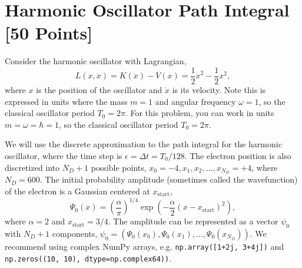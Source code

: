\newpage
\section{Harmonic Oscillator Path Integral [50 Points]}

Consider the harmonic oscillator with Lagrangian,
\begin{equation}
  L(x, \dot{x}) = K(\dot{x}) - V(x) = \frac{1}{2}\dot{x}^2 - \frac{1}{2}x^2,
\end{equation}
where $x$ is the position of the oscillator and $\dot{x}$ is its velocity.
Note this is expressed in units where the mass $m=1$ and angular frequency $\omega=1$, so the classical oscillator period $T_0 = 2\pi$.
For this problem, you can work in units $m = \omega = \hbar = 1$, so the classical oscillator period $T_0 = 2\pi$.

We will use the discrete approximation to the path integral for the harmonic oscillator, where the time step is $\epsilon = \Delta t = T_0/128$.
The electron position is also discretized into $N_D+1$ possible points, $x_0 = -4, x_1, x_2, \ldots, x_{N_D} = +4$, where $N_D=600$.
The initial probability amplitude (sometimes called the wavefunction) of the electron is a Gaussian centered at $x_\mathrm{start}$,
\begin{equation}
  \Psi_0(x) = \left(\frac{\alpha}{\pi}\right)^{1/4}\exp\left(-\frac{\alpha}{2}(x-x_\mathrm{start})^2\right),
\end{equation}
where $\alpha = 2$ and $x_\mathrm{start} = 3/4$.
The amplitude can be represented as a vector $\psi_0$ with $N_D+1$ components, $\psi_0 = (\Psi_0(x_0), \Psi_0(x_1), \ldots, \Psi_0(x_{N_D}))$.
We recommend using complex NumPy arrays, e.g. \texttt{np.array([1+2j, 3+4j])} and \texttt{np.zeros((10, 10), dtype=np.complex64))}.

